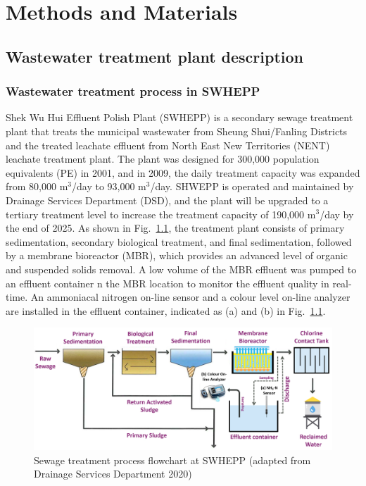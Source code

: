\chapter{Methods and Materials}
\section{Wastewater treatment plant description}
\subsection{Wastewater treatment process in SWHEPP}
Shek Wu Hui Effluent Polish Plant (SWHEPP) is a secondary sewage treatment plant that treats the municipal wastewater from Sheung Shui/Fanling Districts and the treated leachate effluent from North East New Territories (NENT) leachate treatment plant. The plant was designed for 300,000 population equivalents (PE) in 2001, and in 2009, the daily treatment capacity was expanded from 80,000 m$^3$/day to 93,000 m$^3$/day. SHWEPP is operated and maintained by Drainage Services Department (DSD), and the plant will be upgraded to a tertiary treatment level to increase the treatment capacity of 190,000 m$^3$/day by the end of 2025. As shown in Fig.~\ref{fig:SHWEPP-flowchart}, the treatment plant consists of primary sedimentation, secondary biological treatment, and final sedimentation, followed by a membrane bioreactor (MBR), which provides an advanced level of organic and suspended solids removal. A low volume of the MBR effluent was pumped to an effluent container n the MBR location to monitor the effluent quality in real-time. An ammoniacal nitrogen on-line sensor and a colour level on-line analyzer are installed in the effluent container, indicated as (a) and (b) in Fig.~\ref{fig:SHWEPP-flowchart}.

\begin{figure}[!ht]
    \centering
    \includegraphics[width=0.9\columnwidth]{imgs/Sewage-treatment-process-flowchart.png}
    \caption{Sewage treatment process flowchart at SWHEPP (adapted from Drainage Services Department 2020)}
    \label{fig:SHWEPP-flowchart}
\end{figure}

